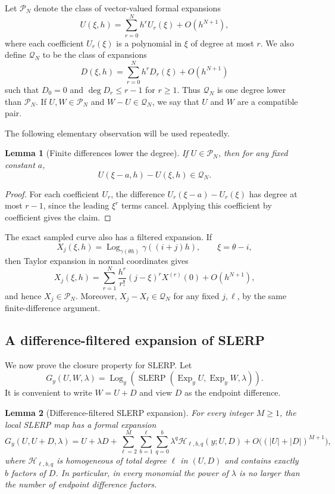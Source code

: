 \documentclass[a4paper,11pt]{article}
\newcommand{\Log}{\operatorname{Log}}
\newcommand{\Exp}{\operatorname{Exp}}
\newcommand{\SLERP}{\operatorname{SLERP}}
\newtheorem{lemma}{Lemma}
\numberwithin{equation}{section}
\begin{document}
Let \(\mathcal P_N\) denote the class of vector-valued formal expansions
\[
        U(\xi,h)=\sum_{r=0}^{N}h^r U_r(\xi)+O(h^{N+1}),
\]
where each coefficient \(U_r(\xi)\) is a polynomial in \(\xi\) of degree at
most \(r\).  We also define \(\mathcal Q_N\) to be the class of expansions
\[
        D(\xi,h)=\sum_{r=0}^{N}h^r D_r(\xi)+O(h^{N+1})
\]
such that \(D_0=0\) and \(\deg D_r\le r-1\) for \(r\ge1\).  Thus
\(\mathcal Q_N\) is one degree lower than \(\mathcal P_N\).  If
\(U,W\in\mathcal P_N\) and \(W-U\in\mathcal Q_N\), we say that \(U\) and
\(W\) are a compatible pair.

The following elementary observation will be used repeatedly.

\begin{lemma}[Finite differences lower the degree]
\label{lem:finite_difference_degree}
If \(U\in\mathcal P_N\), then for any fixed constant \(a\),
\[
        U(\xi-a,h)-U(\xi,h)\in\mathcal Q_N .
\]
\end{lemma}

\begin{proof}
For each coefficient \(U_r\), the difference
\(U_r(\xi-a)-U_r(\xi)\) has degree at most \(r-1\), since the leading
\(\xi^r\) terms cancel.  Applying this coefficient by coefficient gives the
claim.
\end{proof}

The exact sampled curve also has a filtered expansion.  If
\[
        X_j(\xi,h)
        =
        \Log_{\gamma(\theta h)}\gamma((i+j)h),
        \qquad \xi=\theta-i,
\]
then Taylor expansion in normal coordinates gives
\[
        X_j(\xi,h)
        =
        \sum_{r=1}^{N}
        \frac{h^r}{r!}(j-\xi)^r X^{(r)}(0)
        +O(h^{N+1}),
\]
and hence \(X_j\in\mathcal P_N\).  Moreover, \(X_j-X_\ell\in\mathcal Q_N\)
for any fixed \(j,\ell\), by the same finite-difference argument.

\subsection{A difference-filtered expansion of SLERP}

We now prove the closure property for SLERP.  Let
\[
G_y(U,W,\lambda)
=
\Log_y\!\left(\SLERP(\Exp_yU,\Exp_yW,\lambda)\right).
\]
It is convenient to write \(W=U+D\) and view \(D\) as the endpoint difference.

\begin{lemma}[Difference-filtered SLERP expansion]
\label{lem:difference_filtered_slerp}
For every integer \(M\ge1\), the local SLERP map has a formal expansion
\begin{equation}
\label{eq:difference_filtered_slerp}
G_y(U,U+D,\lambda)
=
U+\lambda D
+
\sum_{\ell=2}^{M}
\sum_{b=1}^{\ell}
\sum_{q=0}^{b}
\lambda^q
\mathcal H_{\ell,b,q}(y;U,D)
+
O\bigl((|U|+|D|)^{M+1}\bigr),
\end{equation}
where \(\mathcal H_{\ell,b,q}\) is homogeneous of total degree \(\ell\) in
\((U,D)\) and contains exactly \(b\) factors of \(D\).  In particular, in every
monomial the power of \(\lambda\) is no larger than the number of endpoint
difference factors.
\end{lemma}
\end{document}
